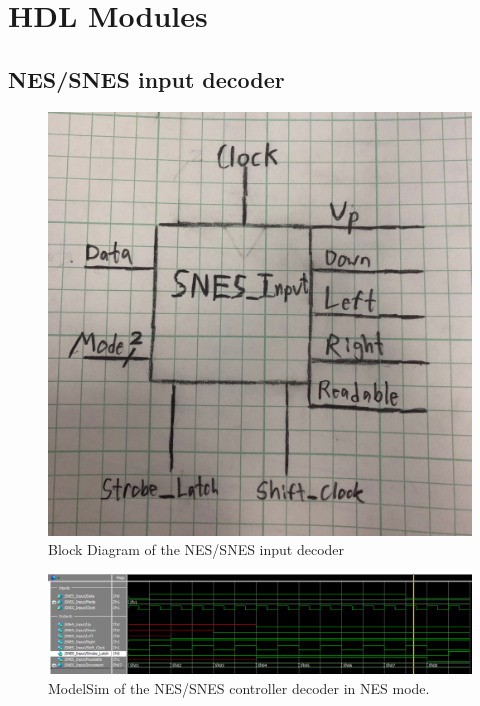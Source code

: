 \documentclass[]{article}
\begin{document}
\section{HDL Modules}
\subsection{NES/SNES input decoder}
\begin{figure}[H]\centering
	\includegraphics[width=\linewidth]{figures/SNES_Input_Diagram}
	\caption{Block Diagram of the NES/SNES input decoder}
\end{figure}
\begin{figure}[H]\centering
	\includegraphics[width=\linewidth]{figures/NES_Input_Sim.png}
	\caption{ModelSim of the NES/SNES controller decoder in NES mode.}
\end{figure}
\end{document}
